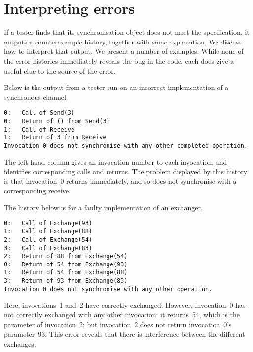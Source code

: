 \section{Interpreting errors}
\label{sec:errors}

If a tester finds that its synchronisation object does not meet the
specification, it outputs a counterexample history, together with some
explanation.  We discuss how to interpret that output.  We present a number of
examples.  While none of the error histories immediately reveals the bug in
the code, each does give a useful clue to the source of the error.


Below is the output from a tester run on an incorrect implementation of a
synchronous channel. 
%
\begin{errorHistory}
\begin{verbatim}
0:   Call of Send(3)
0:   Return of () from Send(3)
1:   Call of Receive
1:   Return of 3 from Receive
Invocation 0 does not synchronise with any other completed operation.
\end{verbatim}
\end{errorHistory}
%
The left-hand column gives an invocation number to each invocation, and
identifies corresponding calls and returns.  The problem displayed by this
history is that invocation~0 returns immediately, and so does not synchronise
with a corresponding receive.


The history below is for a faulty implementation of an exchanger.
%
\begin{errorHistory}
\begin{verbatim}
0:   Call of Exchange(93)
1:   Call of Exchange(88)
2:   Call of Exchange(54)
3:   Call of Exchange(83)
2:   Return of 88 from Exchange(54)
0:   Return of 54 from Exchange(93)
1:   Return of 54 from Exchange(88)
3:   Return of 93 from Exchange(83)
Invocation 0 does not synchronise with any other operation.
\end{verbatim}
\end{errorHistory}
%
Here, invocations~1 and~2 have correctly exchanged.  However, invocation~0 has
not correctly exchanged with any other invocation: it returns~54, which is the
parameter of invocation~2; but invocation~2 does not return invocation~0's
parameter~93.  This error reveals that there is interference between the
different exchanges. 


